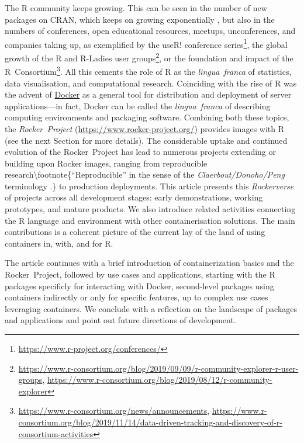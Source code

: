 The R community keeps growing. This can be seen in the number of new
packages on CRAN, which keeps on growing exponentially
\citep{cran:2019}, but also in the numbers of conferences, open
educational resources, meetups, unconferences, and companies taking up,
as exemplified by the useR! conference
series\footnote{\href{https://www.r-project.org/conferences/}{https://www.r-project.org/conferences/}},
the global growth of the R and R-Ladies user
groups\footnote{\href{https://www.r-consortium.org/blog/2019/09/09/r-community-explorer-r-user-groups}{https://www.r-consortium.org/blog/2019/09/09/r-community-explorer-r-user-groups}, \href{https://www.r-consortium.org/blog/2019/08/12/r-community-explorer}{https://www.r-consortium.org/blog/2019/08/12/r-community-explorer}},
or the foundation and impact of the
R~Consortium\footnote{\href{https://www.r-consortium.org/news/announcements}{https://www.r-consortium.org/news/announcements}, \href{https://www.r-consortium.org/blog/2019/11/14/data-driven-tracking-and-discovery-of-r-consortium-activities}{https://www.r-consortium.org/blog/2019/11/14/data-driven-tracking-and-discovery-of-r-consortium-activities}}.
All this cements the role of R as the \emph{lingua~franca} of
statistics, data visualisation, and computational research. Coinciding
with the rise of R was the advent of
\href{https://en.wikipedia.org/wiki/Docker_(software)}{Docker} as a
general tool for distribution and deployment of server applications---in
fact, Docker can be called the \emph{lingua~franca} of describing
computing environments and packaging software. Combining both these
topics, the \emph{Rocker~Project}
(\url{https://www.rocker-project.org/}) provides images with R (see the
next Section for more details). The considerable uptake and continued
evolution of the Rocker~Project has lead to numerous projects extending
or building upon Rocker images, ranging from reproducible
research\textbackslash{}footnote\{``Reproducible'' in the sense of the
\emph{Claerbout/Donoho/Peng} terminology
\citep{barba_terminologies_2018}.\} to production deployments. This
article presents this \emph{Rockerverse} of projects across all
development stages: early demonstrations, working prototypes, and mature
products. We also introduce related activities connecting the R language
and environment with other containerisation solutions. The main
contributions is a coherent picture of the current lay of the land of
using containers in, with, and for R.

The article continues with a brief introduction of containerization
basics and the Rocker~Project, followed by use cases and applications,
starting with the R packages specificly for interacting with Docker,
second-level packages using containers indirectly or only for specific
features, up to complex use cases leveraging containers. We conclude
with a reflection on the landscape of packages and applications and
point out future directions of development.

